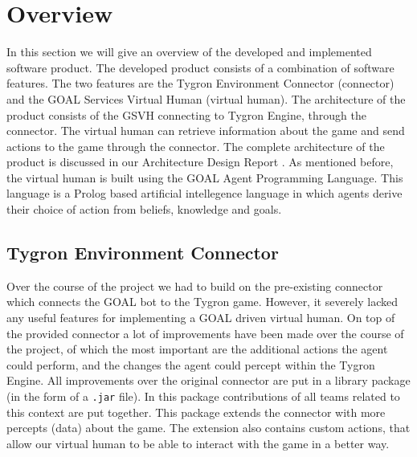 \section{Overview}
In this section we will give an overview of the developed and implemented software product. The developed product consists of a combination of software features. The two features are the Tygron Environment Connector (connector) and the GOAL Services Virtual Human (virtual human). The architecture of the product consists of the GSVH connecting to Tygron Engine, through the connector. The virtual human can retrieve information about the game and send actions to the game through the connector. The complete architecture of the product is discussed in our Architecture Design Report \cite{CTD16}. As mentioned before, the virtual human is built using the GOAL Agent Programming Language\cite{GOAL16}. This language is a Prolog based artificial intellegence language in which agents derive their choice of action from beliefs, knowledge and goals.

\subsection{Tygron Environment Connector}
Over the course of the project we had to build on the pre-existing connector which connects the GOAL bot to the Tygron game. However, it severely lacked any useful features for implementing a GOAL driven virtual human. On top of the provided connector a lot of improvements have been made over the course of the project, of which the most important are the additional actions the agent could perform, and the changes the agent could percept within the Tygron Engine. All improvements over the original connector are put in a library package (in the form of a \texttt{.jar} file). In this package contributions of all teams related to this context are put together. This package extends the connector with more percepts (data) about the game. The extension also contains custom actions, that allow our virtual human to be able to interact with the game in a better way. 

